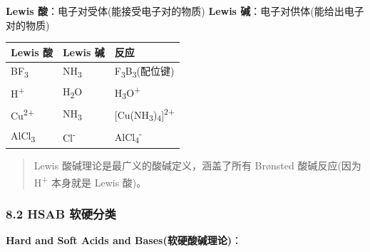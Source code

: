 \documentclass[a4paper,11pt]{ctexart}
\newcounter{none}
\newcommand{\箭}{\ensuremath{\rightarrow}}
\newcommand{\左箭}{\ensuremath{\leftarrow}}
\newcommand{\上箭}{\ensuremath{\uparrow}}
\newcommand{\下箭}{\ensuremath{\downarrow}}
\newcommand{\衡}{\ensuremath{\rightleftharpoons}}
\newcommand{\双箭}{\ensuremath{\leftrightarrow}}
\newcommand{\约等于}{\ensuremath{\approx}}
\newcommand{\小于等于}{\ensuremath{\leq}}
\newcommand{\大于等于}{\ensuremath{\geq}}
\newcommand{\不等于}{\ensuremath{\neq}}
\newcommand{\西格马}{\ensuremath{\sigma}}
\newcommand{\派}{\ensuremath{\pi}}
\begin{document}
\textbf{Lewis 酸}：电子对受体(能接受电子对的物质)
\textbf{Lewis 碱}：电子对供体(能给出电子对的物质)

{\def\LTcaptype{none} %
\begin{longtable}[]{@{}lll@{}}
\toprule\noalign{}
Lewis 酸 & Lewis 碱 & 反应 \\
\midrule\noalign{}
\endhead
\bottomrule\noalign{}
\endlastfoot
BF\textsubscript{3} & NH\textsubscript{3} & F\textsubscript{3}B\textsubscript{3}(配位键) \\
H\textsuperscript{+} & H\textsubscript{2}O & H\textsubscript{3}O\textsuperscript{+} \\
Cu\textsuperscript{2+} & NH\textsubscript{3} & {[}Cu(NH\textsubscript{3})\textsubscript{4}{]}\textsuperscript{2+} \\
AlCl\textsubscript{3} & Cl\textsuperscript{-} & AlCl\textsubscript{4}\textsuperscript{-} \\
\end{longtable}
}

\begin{quote}
Lewis 酸碱理论是最广义的酸碱定义，涵盖了所有 Brønsted 酸碱反应(因为 H\textsuperscript{+} 本身就是 Lewis 酸)。
\end{quote}

\subsubsection{8.2 HSAB 软硬分类}\label{hsab-ux8f6fux786cux5206ux7c7b}

\textbf{Hard and Soft Acids and Bases(软硬酸碱理论)}：
\end{document}
